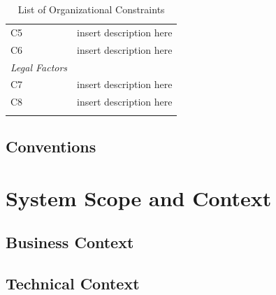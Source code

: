 \documentclass[]{article}
\begin{document}
\begin{longtable}[c]{@{}ll@{}}
\begin{minipage}[t]{0.19\columnwidth}
C5
\end{minipage} & \begin{minipage}[t]{0.75\columnwidth}\raggedright
insert description here
\end{minipage}
\\\addlinespace
\begin{minipage}[t]{0.19\columnwidth}\raggedright
C6
\end{minipage} & \begin{minipage}[t]{0.75\columnwidth}\raggedright
insert description here
\end{minipage}
\\\addlinespace
\begin{minipage}[t]{0.19\columnwidth}\raggedright
\emph{Legal Factors}
\end{minipage}
\\\addlinespace
\begin{minipage}[t]{0.19\columnwidth}\raggedright
C7
\end{minipage} & \begin{minipage}[t]{0.75\columnwidth}\raggedright
insert description here
\end{minipage}
\\\addlinespace
\begin{minipage}[t]{0.19\columnwidth}\raggedright
C8
\end{minipage} & \begin{minipage}[t]{0.75\columnwidth}\raggedright
insert description here
\end{minipage}
\\\addlinespace
\bottomrule
\addlinespace
\caption{List of Organizational Constraints}
\end{longtable}

\subsection{Conventions}

\section{System Scope and Context}

\subsection{Business Context}

\subsection{Technical Context}
\end{document}
